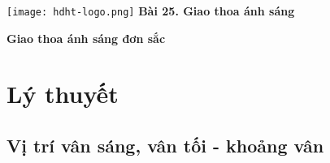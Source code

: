 \newcommand{\chapter}[2][]{
	\newcommand{\chapname}{#2}
	\begin{flushleft}
		\begin{minipage}[t]{\linewidth}
			\texttt{[image: hdht-logo.png]}
			\hspace{0pt}	
			\sffamily\bfseries\large Bài  25. Giao thoa ánh sáng
			\begin{flushleft}
				\huge\bfseries #1
			\end{flushleft}
		\end{minipage}
	\end{flushleft}
	\vspace{1cm}
	\normalfont\normalsize
}
\chapter[Giao thoa ánh sáng đơn sắc]{Giao thoa ánh sáng đơn sắc}

\section{Lý thuyết}

\subsection{Vị trí vân sáng, vân tối - khoảng vân}


